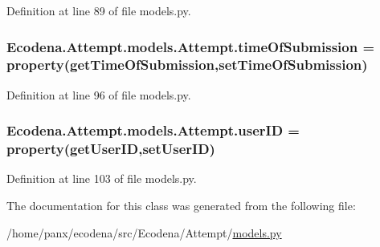 Definition at line 89 of file models.py.

\hypertarget{class_ecodena_1_1_attempt_1_1models_1_1_attempt_a7ca881b180c5ce4d8e3169d0836422b7}{
\subsubsection[{timeOfSubmission}]{\setlength{\rightskip}{0pt plus 5cm}Ecodena.Attempt.models.Attempt.timeOfSubmission = property(getTimeOfSubmission,setTimeOfSubmission)}}
\label{d5/da0/class_ecodena_1_1_attempt_1_1models_1_1_attempt_a7ca881b180c5ce4d8e3169d0836422b7}


Definition at line 96 of file models.py.

\hypertarget{class_ecodena_1_1_attempt_1_1models_1_1_attempt_a30b68dbbff514c8422ba89a5e65e0e7d}{
\subsubsection[{userID}]{\setlength{\rightskip}{0pt plus 5cm}Ecodena.Attempt.models.Attempt.userID = property(getUserID,setUserID)}}
\label{d5/da0/class_ecodena_1_1_attempt_1_1models_1_1_attempt_a30b68dbbff514c8422ba89a5e65e0e7d}


Definition at line 103 of file models.py.



The documentation for this class was generated from the following file:\begin{DoxyCompactItemize}
\item 
/home/panx/ecodena/src/Ecodena/Attempt/\hyperlink{_attempt_2models_8py}{models.py}\end{DoxyCompactItemize}

